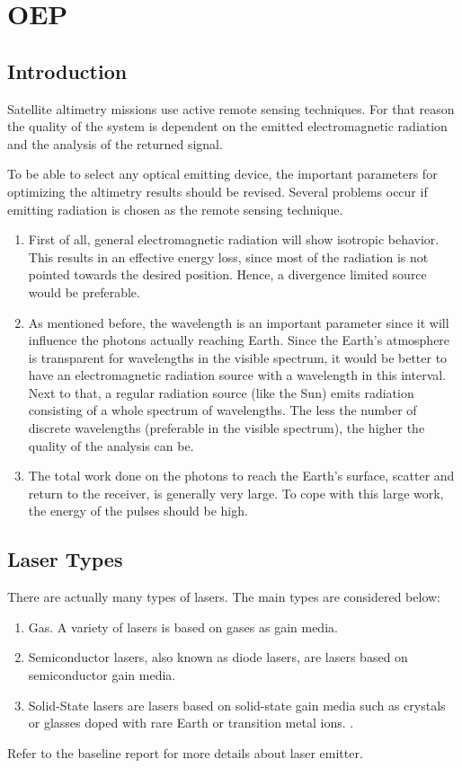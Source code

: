 \section{\acl{OEP}}
\label{designOptionsEmitter}
\subsection{Introduction}
Satellite altimetry missions use active remote sensing techniques. For that reason the quality of the system is dependent on the emitted electromagnetic radiation and the analysis of the returned signal. 

To be able to select any optical emitting device, the important parameters for optimizing the altimetry results should be revised. Several problems occur if emitting radiation is chosen as the remote sensing technique. 
\begin{enumerate}[i]
	\item First of all, general electromagnetic radiation will show isotropic behavior. This results in an effective energy loss, since most of the radiation is not pointed towards the desired position. Hence, a divergence limited source would be preferable.
	\item As mentioned before, the wavelength is an important parameter since it will influence the photons actually reaching Earth. Since the Earth's atmosphere is transparent for wavelengths in the visible spectrum, it would be better to have an electromagnetic radiation source with a wavelength in this interval. Next to that, a regular radiation source (like the Sun) emits radiation consisting of a whole spectrum of wavelengths. The less the number of discrete wavelengths (preferable in the visible spectrum), the higher the quality of the analysis can be.
	\item The total work done on the photons to reach the Earth's surface, scatter and return to the receiver, is generally very large. To cope with this large work, the energy of the pulses should be high.  
\end{enumerate}

\subsection{Laser Types}
	\label{blDOLSRtypes}
There are actually many types of \acs{laser}s. The main types are considered below:
\begin{enumerate}
	\item Gas. A variety of \acs{laser}s is based on gases as gain media. 
	\item Semiconductor \acs{laser}s, also known as diode \acs{laser}s, are \acs{laser}s based on semiconductor gain media. 
	\item Solid-State \acs{laser}s are \acs{laser}s based on solid-state gain media such as crystals or glasses doped with rare Earth or transition metal ions. . \cite{lasertech}
\end{enumerate} 
Refer to the baseline report for more details about \acs{laser} emitter.
